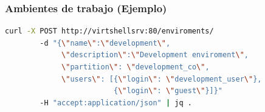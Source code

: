\documentclass[xcolor=dvipsnames,table]{beamer} %
\begin{document}

\begin{frame}[fragile]
	\frametitle{Ambientes de trabajo (Ejemplo)}
	\begin{lstlisting}[language=Bash,basicstyle=\ttfamily\scriptsize,keywordstyle=\color{blue}]
	curl -X POST http://virtshellsrv:80/enviroments/ 
	    -d "{\"name\":\"development\",
	         \"description\":\"Development enviroment\", 
	         \"partition\": \"development_co\", 
	         \"users\": [{\"login\": \"development_user\"}, 
	                     {\"login\": \"guest\"}]}" 
	    -H "accept:application/json" | jq .
	\end{lstlisting}
\end{frame}


\end{document}
